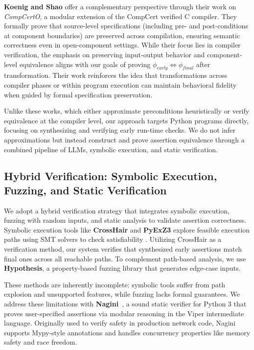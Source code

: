 \documentclass[8pt]{extarticle}
\begin{document}
\textbf{Koenig and Shao} \cite{KoenigShao2021CompCertO} offer a complementary perspective through their work on \textit{CompCertO}, a modular extension of the CompCert verified C compiler. They formally prove that source-level specifications (including pre- and post-conditions at component boundaries) are preserved across compilation, ensuring semantic correctness even in open-component settings. While their focus lies in compiler verification, the emphasis on preserving input-output behavior and component-level equivalence aligns with our goals of proving \(\phi_{early} \Leftrightarrow \phi_{final}\) after transformation. Their work reinforces the idea that transformations across compiler phases or within program execution can maintain behavioral fidelity when guided by formal specification preservation.

Unlike these works, which either approximate preconditions heuristically or verify equivalence at the compiler level, our approach targets Python programs directly, focusing on synthesizing and verifying early run-time checks. We do not infer approximations but instead construct and prove assertion equivalence through a combined pipeline of LLMs, symbolic execution, and static verification.

\subsection{Hybrid Verification: Symbolic Execution, Fuzzing, and Static Verification}

We adopt a hybrid verification strategy that integrates symbolic execution, fuzzing with random inputs, and static analysis to validate assertion correctness. Symbolic execution tools like \textbf{CrossHair} and \textbf{PyExZ3} explore feasible execution paths using SMT solvers to check satisfiability \cite{CrossHairTool, ball2015, bruni2011}. Utilizing CrossHair as a verification method, our system verifies that synthesized early assertions match final ones across all reachable paths. To complement path-based analysis, we use \textbf{Hypothesis}, a property-based fuzzing library that generates edge-case inputs.

These methods are inherently incomplete: symbolic tools suffer from path explosion and unsupported features, while fuzzing lacks formal guarantees. We address these limitations with \textbf{Nagini}~\cite{eilers2018}, a sound static verifier for Python 3 that proves user-specified assertions via modular reasoning in the Viper intermediate language. Originally used to verify safety in production network code, Nagini supports Mypy-style annotations and handles concurrency properties like memory safety and race freedom.
\end{document}
